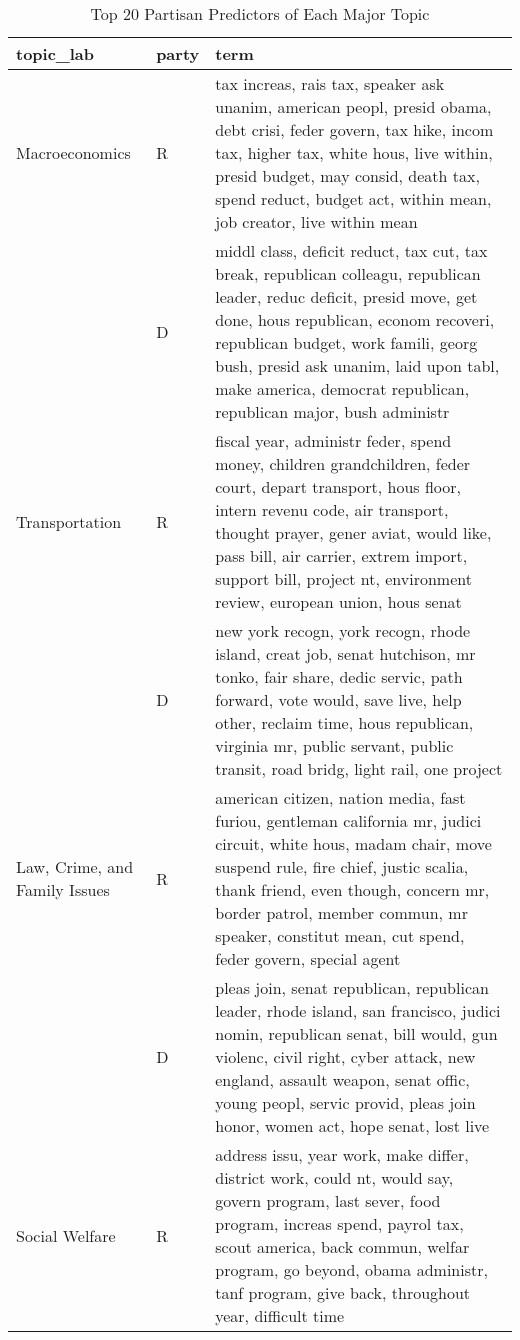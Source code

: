 \begingroup\tiny
\begin{longtable}{p{}p{}p{}}
\caption{Top 20 Partisan Predictors of Each Major Topic} \\ 
  \hline
topic_lab & party & term \\ 
  \hline
Macroeconomics & R & tax increas, rais tax, speaker ask unanim, american peopl, presid obama, debt crisi, feder govern, tax hike, incom tax, higher tax, white hous, live within, presid budget, may consid, death tax, spend reduct, budget act, within mean, job creator, live within mean \\ 
   & D & middl class, deficit reduct, tax cut, tax break, republican colleagu, republican leader, reduc deficit, presid move, get done, hous republican, econom recoveri, republican budget, work famili, georg bush, presid ask unanim, laid upon tabl, make america, democrat republican, republican major, bush administr \\ 
   \hline
Transportation & R & fiscal year, administr feder, spend money, children grandchildren, feder court, depart transport, hous floor, intern revenu code, air transport, thought prayer, gener aviat, would like, pass bill, air carrier, extrem import, support bill, project nt, environment review, european union, hous senat \\ 
   & D & new york recogn, york recogn, rhode island, creat job, senat hutchison, mr tonko, fair share, dedic servic, path forward, vote would, save live, help other, reclaim time, hous republican, virginia mr, public servant, public transit, road bridg, light rail, one project \\ 
   \hline
Law, Crime, and Family Issues & R & american citizen, nation media, fast furiou, gentleman california mr, judici circuit, white hous, madam chair, move suspend rule, fire chief, justic scalia, thank friend, even though, concern mr, border patrol, member commun, mr speaker, constitut mean, cut spend, feder govern, special agent \\ 
   & D & pleas join, senat republican, republican leader, rhode island, san francisco, judici nomin, republican senat, bill would, gun violenc, civil right, cyber attack, new england, assault weapon, senat offic, young peopl, servic provid, pleas join honor, women act, hope senat, lost live \\ 
   \hline
Social Welfare & R & address issu, year work, make differ, district work, could nt, would say, govern program, last sever, food program, increas spend, payrol tax, scout america, back commun, welfar program, go beyond, obama administr, tanf program, give back, throughout year, difficult time \\ 

\end{longtable}
